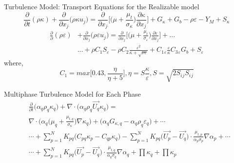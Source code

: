 \begin{frame}{Turbulence Model: Transport Equations for the Realizable \boldmath{$\kappa-\varepsilon$} model}\label{Rkvarepsilon_par}
    \begin{equation}\label{Rkappa_eqn}
    \frac{\partial}{\partial t} (\rho \kappa) + \frac{\partial}{\partial x_j}\big(\rho \kappa u_j\big) = \frac{\partial}{\partial x_j}\bigg[\Big(\mu + \frac{\mu_t}{\sigma_\kappa}\Big)\frac{\partial \kappa}{\partial x_j}\bigg] + G_\kappa + G_b -\rho\varepsilon-Y_M+S_\kappa
    \end{equation}
    \begin{equation}\label{Repsilon_eqn}
    \begin{split}
    \frac{\partial}{\partial}(\rho \varepsilon) 
    & + \frac{\partial}{\partial x_j}\big(\rho \varepsilon u_j\big) = \frac{\partial}{\partial x_j}\bigg[\Big(\mu + \frac{\mu_t}{\sigma_\varepsilon}\Big)\frac{\partial \varepsilon}{\partial x_j}\bigg]+ ... \\
    &... + \rho C_1 S_\varepsilon - \rho C_2 \frac{\varepsilon^2}{\kappa + \sqrt{\nu \varepsilon}} + C_1{}_\varepsilon \frac{\varepsilon}{\kappa} C_3{}_\varepsilon G_b + S_\varepsilon
    \end{split}
   \end{equation}
where,
\begin{equation}\label{C1_eqn}
    C_1 = max \bigg [0.43, \frac{\eta}{\eta + 5}\bigg], \eta = S\frac{\kappa}{\varepsilon}, S = \sqrt{2 S_i{}_j S_i{}_j}
\end{equation}
\end{frame}

\begin{frame}{Multiphase \boldmath{$\kappa-\varepsilon$} Turbulence Model for Each Phase}
    \begin{equation} \label{Rkappamulti_eqn}
    \begin{split}
    & \frac{\partial}{\partial t}\Big(\alpha_q\rho_q\kappa_q\Big) 
    + \nabla\cdot\Big(\alpha_q\rho_q \vec{U_q}\kappa_q\Big) = \\
    & \nabla\cdot\Bigg(\alpha_q\bigg(\mu_q + \frac{\mu_{t,q}}{\sigma_\kappa}\bigg)\nabla \kappa_q\Bigg) + \Big(\alpha_q G_{\kappa,q} - \alpha_q\rho_q\varepsilon_q\Big) +\dotsm \\
    &\dotsm + \sum_{p=1}^{N} K_{pq}\Big(C_{pq}\kappa_p - C_{qp}\kappa_q\Big) - \sum_{p=1}^{N} K_{pq} \Big(\vec{U_p}-\vec{U_q}\Big)\cdot\frac{\mu_{t,p}}{\alpha_p \sigma_p}\nabla \alpha_p +\dotsm \\
    &\dotsm + \sum_{p=1}^{N} K_{pq} \Big(\vec{U_p}-\vec{U_q}\Big)\cdot\frac{\mu_{t,q}}{\alpha_q \sigma_q}\nabla \alpha_q + \prod \kappa_q + \prod \kappa_p
    \end{split}
\end{equation}
\end{frame}

